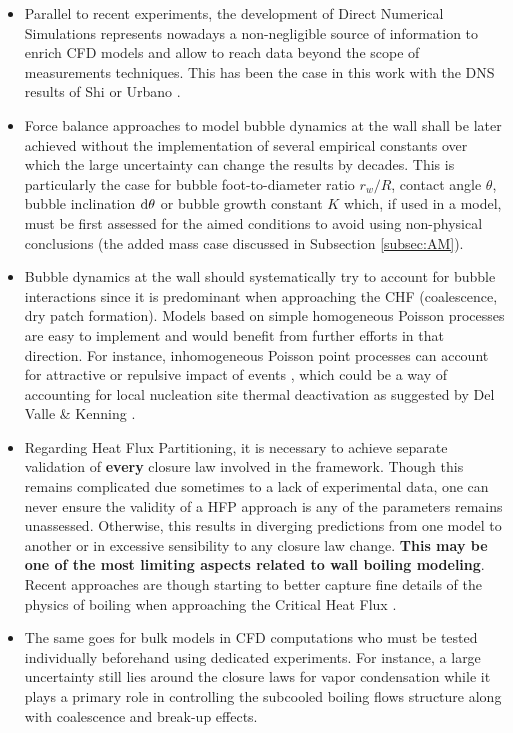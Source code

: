 \begin{itemize}

\item Parallel to recent experiments, the development of Direct Numerical Simulations represents nowadays a non-negligible source of information to enrich CFD models and allow to reach data beyond the scope of measurements techniques. This has been the case in this work with the DNS results of Shi \etal \cite{shi_drag_2021} or Urbano \etal \cite{urbano_direct_2018}.

\item Force balance approaches to model bubble dynamics at the wall shall be later achieved without the implementation of several empirical constants over which the large uncertainty can change the results by decades. This is particularly the case for bubble foot-to-diameter ratio $r_{w}/R$, contact angle $\theta$, bubble inclination $\mathrm{d}\theta$ or bubble growth constant $K$ which, if used in a model, must be first assessed for the aimed conditions to avoid using non-physical conclusions (\eg the added mass case discussed in Subsection \ref{subsec:AM}).


\item Bubble dynamics at the wall should systematically try to account for bubble interactions since it is predominant when approaching the CHF (\eg coalescence, dry patch formation). Models based on simple homogeneous Poisson processes are easy to implement and would benefit from further efforts in that direction. For instance, inhomogeneous Poisson point processes can account for attractive or repulsive impact of events \cite{daley_introduction_2003}, which could be a way of accounting for local nucleation site thermal deactivation as suggested by Del Valle \& Kenning \cite{del_valle_subcooled_1985}.

\item Regarding Heat Flux Partitioning, it is necessary to achieve separate validation of \textbf{every} closure law involved in the framework. Though this remains complicated due sometimes to a lack of experimental data, one can never ensure the validity of a HFP approach is any of the parameters remains unassessed. Otherwise, this results in diverging predictions from one model to another or in excessive sensibility to any closure law change. \textbf{This may be one of the most limiting aspects related to wall boiling modeling}. Recent approaches are though starting to better capture fine details of the physics of boiling when approaching the Critical Heat Flux \cite{baglietto_boiling_2019}.

\item The same goes for bulk models in CFD computations who must be tested individually beforehand using dedicated experiments. For instance, a large uncertainty still lies around the closure laws for vapor condensation while it plays a primary role in controlling the subcooled boiling flows structure along with coalescence and break-up effects.

\end{itemize}

